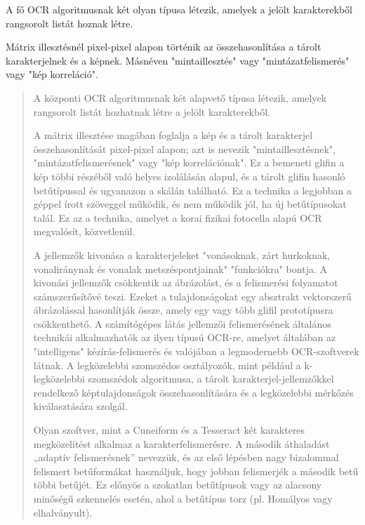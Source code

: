 \cite{bradski2000opencv}
A fő OCR algoritmusnak két olyan típusa létezik, amelyek a jelölt karakterekből rangsorolt listát hoznak létre.

Mátrix illesztésnél pixel-pixel alapon történik az összehasonlítása a tárolt karakterjelnek és a képnek. Másnéven "mintaillesztés" vagy "mintázatfelismerés" vagy "kép korreláció". 

\begin{quotation}
	A központi OCR algoritmusnak két alapvető típusa létezik, amelyek rangsorolt listát hozhatnak létre a jelölt karakterekből.
	
	A mátrix illesztése magában foglalja a kép és a tárolt karakterjel összehasonlítását pixel-pixel alapon; azt is nevezik "mintaillesztésnek", "mintázatfelismerésnek" vagy "kép korrelációnak". Ez a bemeneti glifin a kép többi részéből való helyes izolálásán alapul, és a tárolt glifin hasonló betűtípussal és ugyanazon a skálán található. Ez a technika a legjobban a géppel írott szöveggel működik, és nem működik jól, ha új betűtípusokat talál. Ez az a technika, amelyet a korai fizikai fotocella alapú OCR megvalósít, közvetlenül.
	
	A jellemzők kivonása a karakterjeleket "vonásoknak, zárt hurkoknak, vonaliránynak és vonalak metszéspontjainak" "funkciókra" bontja. A kivonási jellemzők csökkentik az ábrázolást, és a felismerési folyamatot számszerűsítővé teszi. Ezeket a tulajdonságokat egy absztrakt vektorszerű ábrázolással hasonlítják össze, amely egy vagy több glifil prototípusra csökkenthető. A számítógépes látás jellemzői felismerésének általános technikái alkalmazhatók az ilyen típusú OCR-re, amelyet általában az "intelligens" kézírás-felismerés és valójában a legmodernebb OCR-szoftverek látnak. A legközelebbi szomszédos osztályozók, mint például a k-legközelebbi szomszédok algoritmusa, a tárolt karakterjel-jellemzőkkel rendelkező képtulajdonságok összehasonlítására és a legközelebbi mérkőzés kiválasztására szolgál.
	
	Olyan szoftver, mint a Cuneiform és a Tesseract két karakteres megközelítést alkalmaz a karakterfelismerésre. A második áthaladást „adaptív felismerésnek” nevezzük, és az első lépésben nagy bizalommal felismert betűformákat használjuk, hogy jobban felismerjék a második betű többi betűjét. Ez előnyös a szokatlan betűtípusok vagy az alacsony minőségű szkennelés esetén, ahol a betűtípus torz (pl. Homályos vagy elhalványult).
\end{quotation}
